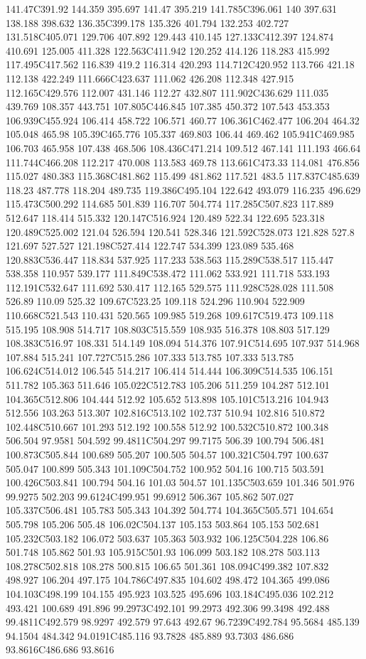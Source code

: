 141.47C391.92 144.359 395.697 141.47 395.219 141.785C396.061 140 397.631 138.188 398.632 136.35C399.178 135.326 401.794 132.253 402.727 131.518C405.071 129.706 407.892 129.443 410.145 127.133C412.397 124.874 410.691 125.005 411.328 122.563C411.942 120.252 414.126 118.283 415.992 117.495C417.562 116.839 419.2 116.314 420.293 114.712C420.952 113.766 421.18 112.138 422.249 111.666C423.637 111.062 426.208 112.348 427.915 112.165C429.576 112.007 431.146 112.27 432.807 111.902C436.629 111.035 439.769 108.357 443.751 107.805C446.845 107.385 450.372 107.543 453.353 106.939C455.924 106.414 458.722 106.571 460.77 106.361C462.477 106.204 464.32 105.048 465.98 105.39C465.776 105.337 469.803 106.44 469.462 105.941C469.985 106.703 465.958 107.438 468.506 108.436C471.214 109.512 467.141 111.193 466.64 111.744C466.208 112.217 470.008 113.583 469.78 113.661C473.33 114.081 476.856 115.027 480.383 115.368C481.862 115.499 481.862 117.521 483.5 117.837C485.639 118.23 487.778 118.204 489.735 119.386C495.104 122.642 493.079 116.235 496.629 115.473C500.292 114.685 501.839 116.707 504.774 117.285C507.823 117.889 512.647 118.414 515.332 120.147C516.924 120.489 522.34 122.695 523.318 120.489C525.002 121.04 526.594 120.541 528.346 121.592C528.073 121.828 527.8 121.697 527.527 121.198C527.414 122.747 534.399 123.089 535.468 120.883C536.447 118.834 537.925 117.233 538.563 115.289C538.517 115.447 538.358 110.957 539.177 111.849C538.472 111.062 533.921 111.718 533.193 112.191C532.647 111.692 530.417 112.165 529.575 111.928C528.028 111.508 526.89 110.09 525.32 109.67C523.25 109.118 524.296 110.904 522.909 110.668C521.543 110.431 520.565 109.985 519.268 109.617C519.473 109.118 515.195 108.908 514.717 108.803C515.559 108.935 516.378 108.803 517.129 108.383C516.97 108.331 514.149 108.094 514.376 107.91C514.695 107.937 514.968 107.884 515.241 107.727C515.286 107.333 513.785 107.333 513.785 106.624C514.012 106.545 514.217 106.414 514.444 106.309C514.535 106.151 511.782 105.363 511.646 105.022C512.783 105.206 511.259 104.287 512.101 104.365C512.806 104.444 512.92 105.652 513.898 105.101C513.216 104.943 512.556 103.263 513.307 102.816C513.102 102.737 510.94 102.816 510.872 102.448C510.667 101.293 512.192 100.558 512.92 100.532C510.872 100.348 506.504 97.9581 504.592 99.4811C504.297 99.7175 506.39 100.794 506.481 100.873C505.844 100.689 505.207 100.505 504.57 100.321C504.797 100.637 505.047 100.899 505.343 101.109C504.752 100.952 504.16 100.715 503.591 100.426C503.841 100.794 504.16 101.03 504.57 101.135C503.659 101.346 501.976 99.9275 502.203 99.6124C499.951 99.6912 506.367 105.862 507.027 105.337C506.481 105.783 505.343 104.392 504.774 104.365C505.571 104.654 505.798 105.206 505.48 106.02C504.137 105.153 503.864 105.153 502.681 105.232C503.182 106.072 503.637 105.363 503.932 106.125C504.228 106.86 501.748 105.862 501.93 105.915C501.93 106.099 503.182 108.278 503.113 108.278C502.818 108.278 500.815 106.65 501.361 108.094C499.382 107.832 498.927 106.204 497.175 104.786C497.835 104.602 498.472 104.365 499.086 104.103C498.199 104.155 495.923 103.525 495.696 103.184C495.036 102.212 493.421 100.689 491.896 99.2973C492.101 99.2973 492.306 99.3498 492.488 99.4811C492.579 98.9297 492.579 97.643 492.67 96.7239C492.784 95.5684 485.139 94.1504 484.342 94.0191C485.116 93.7828 485.889 93.7303 486.686 93.8616C486.686 93.8616 
